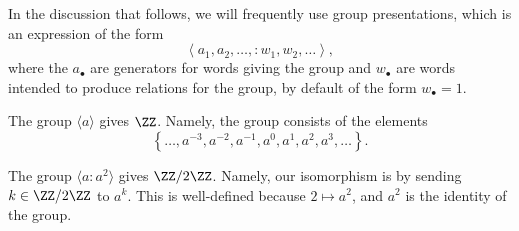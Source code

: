 \documentclass[../notes.tex]{subfiles}
\begin{document}
In the discussion that follows, we will frequently use group presentations, which is an expression of the form
\[\left\langle a_1,a_2,\ldots,:w_1,w_2,\ldots\right\rangle,\]
where the $a_\bullet$ are generators for words giving the group and $w_\bullet$ are words intended to produce relations for the group, by default of the form $w_\bullet=1$.
\begin{example}
	The group $\langle a\rangle$ gives $\ZZ$. Namely, the group consists of the elements
	\[\left\{\ldots,a^{-3},a^{-2},a^{-1},a^0,a^1,a^2,a^3,\ldots\right\}.\]
\end{example}
\begin{example}
	The group $\langle a:a^2\rangle$ gives $\ZZ/2\ZZ$. Namely, our isomorphism is by sending $k\in\ZZ/2\ZZ$ to $a^k$. This is well-defined because $2\mapsto a^2$, and $a^2$ is the identity of the group.
\end{example}
\end{document}
